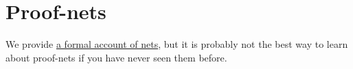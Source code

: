 \section{Proof-nets}\label{proof-nets}

We provide \href{a_formal_account_of_nets}{a formal account of nets},
but it is probably not the best way to learn about proof-nets if you
have never seen them before.

